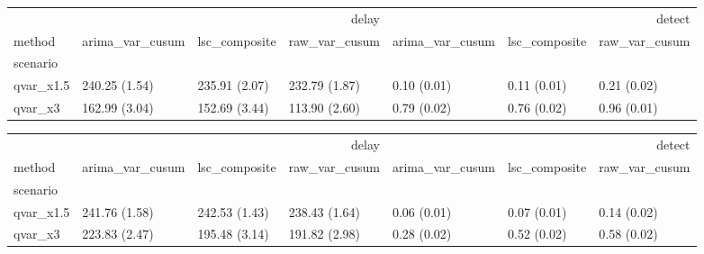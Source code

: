 \begin{tabular}{lllllll}
\toprule
 & \multicolumn{3}{r}{delay} & \multicolumn{3}{r}{detect} \\
method & arima_var_cusum & lsc_composite & raw_var_cusum & arima_var_cusum & lsc_composite & raw_var_cusum \\
scenario &  &  &  &  &  &  \\
\midrule
qvar_x1.5 & 240.25 (1.54) & 235.91 (2.07) & 232.79 (1.87) & 0.10 (0.01) & 0.11 (0.01) & 0.21 (0.02) \\
qvar_x3 & 162.99 (3.04) & 152.69 (3.44) & 113.90 (2.60) & 0.79 (0.02) & 0.76 (0.02) & 0.96 (0.01) \\
\bottomrule
\end{tabular}

\begin{tabular}{lllllll}
\toprule
 & \multicolumn{3}{r}{delay} & \multicolumn{3}{r}{detect} \\
method & arima_var_cusum & lsc_composite & raw_var_cusum & arima_var_cusum & lsc_composite & raw_var_cusum \\
scenario &  &  &  &  &  &  \\
\midrule
qvar_x1.5 & 241.76 (1.58) & 242.53 (1.43) & 238.43 (1.64) & 0.06 (0.01) & 0.07 (0.01) & 0.14 (0.02) \\
qvar_x3 & 223.83 (2.47) & 195.48 (3.14) & 191.82 (2.98) & 0.28 (0.02) & 0.52 (0.02) & 0.58 (0.02) \\
\bottomrule
\end{tabular}
